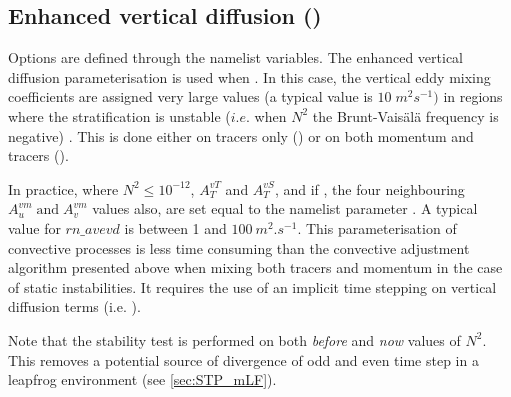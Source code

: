 \documentclass[../tex_main/NEMO_manual]{subfiles}
\begin{document}
\subsection{Enhanced vertical diffusion (\protect{})}
\label{subsec:ZDF_evd}


Options are defined through the   namelist variables.
The enhanced vertical diffusion parameterisation is used when . 
In this case, the vertical eddy mixing coefficients are assigned very large values 
(a typical value is $10\;m^2s^{-1})$ in regions where the stratification is unstable 
($i.e.$ when $N^2$ the Brunt-Vais\"{a}l\"{a} frequency is negative) 
\citep{Lazar_PhD97, Lazar_al_JPO99}. This is done either on tracers only 
() or on both momentum and tracers ().

In practice, where $N^2\leq 10^{-12}$, $A_T^{vT}$ and $A_T^{vS}$, and 
if , the four neighbouring $A_u^{vm} \;\mbox{and}\;A_v^{vm}$ 
values also, are set equal to the namelist parameter . A typical value 
for $rn\_avevd$ is between 1 and $100~m^2.s^{-1}$. This parameterisation of 
convective processes is less time consuming than the convective adjustment 
algorithm presented above when mixing both tracers and momentum in the 
case of static instabilities. It requires the use of an implicit time stepping on 
vertical diffusion terms (i.e. ). 

Note that the stability test is performed on both \textit{before} and \textit{now} 
values of $N^2$. This removes a potential source of divergence of odd and
even time step in a leapfrog environment \citep{Leclair_PhD2010} (see \autoref{sec:STP_mLF}).

\end{document}

